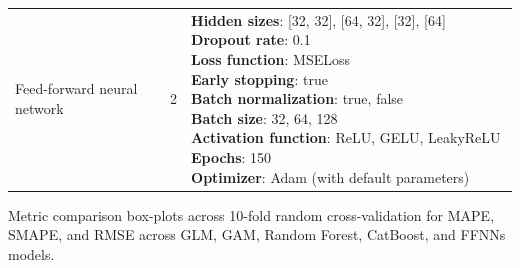 \begin{longtable}{p{} p{} p{}}
\hdashline

Feed-forward neural network 
& 2 
& \makecell[l]{
\textbf{Hidden sizes}: [32, 32], [64, 32], [32], [64] \\
\textbf{Dropout rate}: 0.1 \\
\textbf{Loss function}: MSELoss \\
\textbf{Early stopping}: true \\
\textbf{Batch normalization}: true, false \\
\textbf{Batch size}: 32, 64, 128 \\
\textbf{Activation function}: ReLU, GELU, LeakyReLU
\textbf{Epochs}: 150 \\
\textbf{Optimizer}: Adam (with default parameters) 
} \\

\end{longtable}
\normalsize

Metric comparison box-plots across 10-fold random cross-validation for MAPE, SMAPE, and RMSE across GLM, GAM, Random Forest, CatBoost, and FFNNs models. 

